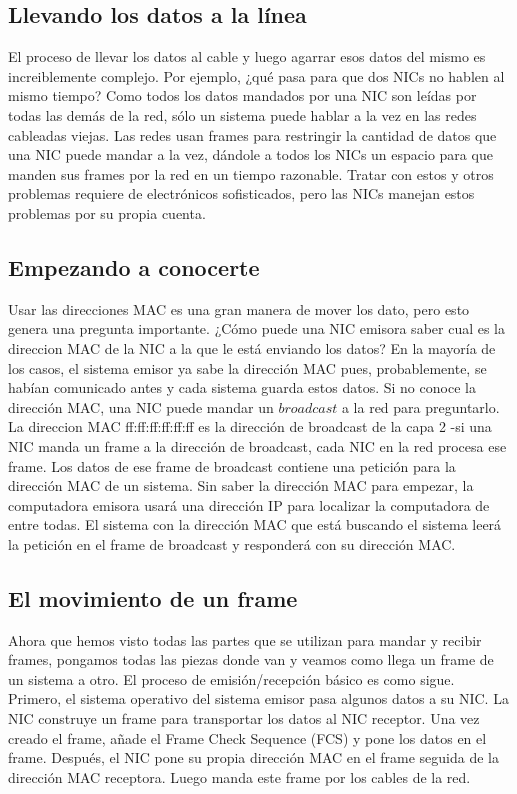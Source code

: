 \documentclass[12pt]{report}
\begin{document}
\subsection{Llevando los datos a la línea}
El proceso de llevar los datos al cable y luego agarrar esos datos del mismo
es increiblemente complejo. Por ejemplo, ¿qué pasa para que dos NICs no 
hablen al mismo tiempo? Como todos los datos mandados por una NIC son leídas
por todas las demás de la red, sólo un sistema puede hablar a la vez en las redes cableadas 
viejas. Las redes usan frames para restringir la cantidad de datos que una NIC
puede mandar a la vez, dándole a todos los NICs un espacio para que manden 
sus frames por la red en un tiempo razonable.
Tratar con estos y otros problemas requiere de electrónicos sofisticados, 
pero las NICs manejan estos problemas por su propia cuenta.

\subsection{Empezando a conocerte}
Usar las direcciones MAC es una gran manera de mover los dato, pero esto
genera una pregunta importante. ¿Cómo puede una NIC emisora saber cual es la direccion MAC 
de la NIC a la que le está enviando los datos? En la mayoría de los casos,
el sistema emisor ya sabe la dirección MAC pues, probablemente, se habían comunicado antes y
cada sistema guarda estos datos. Si no conoce la dirección MAC, una NIC puede mandar 
un $\textit{broadcast}$ a la red para preguntarlo.
La direccion MAC ff:ff:ff:ff:ff:ff es la dirección de broadcast de la capa 2
-si una NIC manda un frame a la dirección de broadcast, cada NIC en la red procesa ese frame.
Los datos de ese frame de broadcast contiene una petición para la dirección MAC de un sistema.
Sin saber la dirección MAC para empezar, la computadora emisora usará una dirección IP 
para localizar la computadora de entre todas. El sistema con la dirección MAC que está buscando el sistema
leerá la petición en el frame de broadcast y responderá con su dirección MAC.

\subsection{El movimiento de un frame}
Ahora que hemos visto todas las partes que se utilizan para mandar y recibir frames,
pongamos todas las piezas donde van y veamos como llega un frame de un sistema a otro.
El proceso de emisión/recepción básico es como sigue.
Primero, el sistema operativo del sistema emisor pasa algunos datos a su NIC.
La NIC construye un frame para transportar los datos al NIC receptor.
Una vez creado el frame, añade el Frame Check Sequence (FCS) y pone los datos en el frame.
Después, el NIC pone su propia dirección MAC en el frame seguida de la dirección MAC
receptora. Luego manda este frame por los cables de la red.
\end{document}
